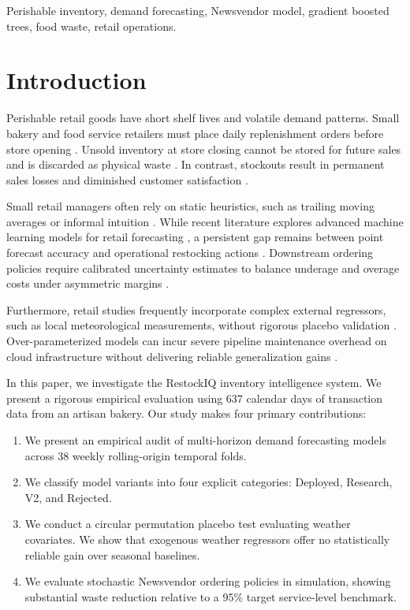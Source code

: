 \documentclass[conference]{IEEEtran}
\begin{document}
\begin{IEEEkeywords}
Perishable inventory, demand forecasting, Newsvendor model, gradient boosted trees, food waste, retail operations.
\end{IEEEkeywords}

\section{Introduction}
Perishable retail goods have short shelf lives and volatile demand patterns. Small bakery and food service retailers must place daily replenishment orders before store opening \cite{gartner2024automated}. Unsold inventory at store closing cannot be stored for future sales and is discarded as physical waste \cite{chowdhury2025predictive}. In contrast, stockouts result in permanent sales losses and diminished customer satisfaction \cite{access2025supply}. 

Small retail managers often rely on static heuristics, such as trailing moving averages or informal intuition \cite{cherian2025demand}. While recent literature explores advanced machine learning models for retail forecasting \cite{ganguly2024enhancing, jatte2025optimization}, a persistent gap remains between point forecast accuracy and operational restocking actions \cite{groene2024introduction}. Downstream ordering policies require calibrated uncertainty estimates to balance underage and overage costs under asymmetric margins \cite{avuduri2025smartstock}.

Furthermore, retail studies frequently incorporate complex external regressors, such as local meteorological measurements, without rigorous placebo validation \cite{lalitha2025enhanced}. Over-parameterized models can incur severe pipeline maintenance overhead on cloud infrastructure without delivering reliable generalization gains \cite{sandeep2023smart}.

In this paper, we investigate the RestockIQ inventory intelligence system. We present a rigorous empirical evaluation using 637 calendar days of transaction data from an artisan bakery. Our study makes four primary contributions:
\begin{enumerate}
    \item We present an empirical audit of multi-horizon demand forecasting models across 38 weekly rolling-origin temporal folds.
    \item We classify model variants into four explicit categories: Deployed, Research, V2, and Rejected.
    \item We conduct a circular permutation placebo test evaluating weather covariates. We show that exogenous weather regressors offer no statistically reliable gain over seasonal baselines.
    \item We evaluate stochastic Newsvendor ordering policies in simulation, showing substantial waste reduction relative to a 95\% target service-level benchmark.
\end{enumerate}
\end{document}

